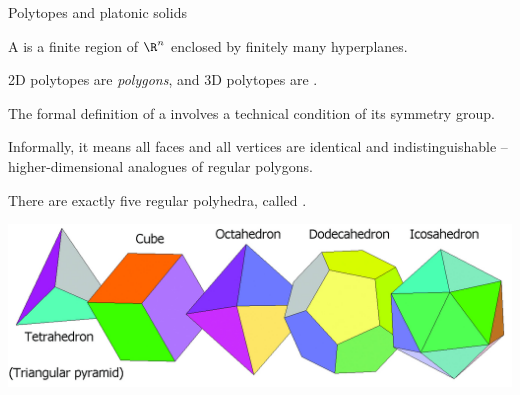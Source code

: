 \documentclass[8pt, handout]{beamer}
\newcommand{\Pause}{}
\begin{document}

\begin{frame}{Polytopes and platonic solids} %
  
  A  is a finite region of $\R^n$ enclosed by
  finitely many hyperplanes. \bigskip\Pause

  2D polytopes are \emph{polygons}, and 3D polytopes are
  . \bigskip\Pause
  
  The formal definition of a  involves a
  technical condition of its symmetry group. \bigskip\Pause


  Informally, it means all faces and all vertices are
  identical and indistinguishable -- higher-dimensional analogues of
  regular polygons. \bigskip\Pause

  There are exactly five regular polyhedra, called
  .

  \begin{center}
    \includegraphics[width=.8\textwidth]{platonic-solids.jpg}
  \end{center}

\end{frame}

\end{document}
